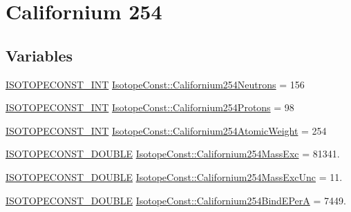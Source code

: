 \hypertarget{group___isotope_const-_californium-_cf254}{}\section{Californium 254}
\label{group___isotope_const-_californium-_cf254}
\subsection*{Variables}
\begin{DoxyCompactItemize}
\item 
\mbox{\hyperlink{group___isotope_const-_macros_ga5f18360b3e99483a35c32d789e62621c}{I\+S\+O\+T\+O\+P\+E\+C\+O\+N\+S\+T\+\_\+\+I\+NT}} \mbox{\hyperlink{group___isotope_const-_californium-_cf254_gaa3d11e9fb2a18ad59194f0b610e022b3}{Isotope\+Const\+::\+Californium254\+Neutrons}} = 156
\item 
\mbox{\hyperlink{group___isotope_const-_macros_ga5f18360b3e99483a35c32d789e62621c}{I\+S\+O\+T\+O\+P\+E\+C\+O\+N\+S\+T\+\_\+\+I\+NT}} \mbox{\hyperlink{group___isotope_const-_californium-_cf254_ga28959ec5181347d129c244cd2857908b}{Isotope\+Const\+::\+Californium254\+Protons}} = 98
\item 
\mbox{\hyperlink{group___isotope_const-_macros_ga5f18360b3e99483a35c32d789e62621c}{I\+S\+O\+T\+O\+P\+E\+C\+O\+N\+S\+T\+\_\+\+I\+NT}} \mbox{\hyperlink{group___isotope_const-_californium-_cf254_ga32bf7d3b9f1b613912fcafc1d3f68294}{Isotope\+Const\+::\+Californium254\+Atomic\+Weight}} = 254
\item 
\mbox{\hyperlink{group___isotope_const-_macros_ga8f45a7272ce02c0b4c65c44636ed719a}{I\+S\+O\+T\+O\+P\+E\+C\+O\+N\+S\+T\+\_\+\+D\+O\+U\+B\+LE}} \mbox{\hyperlink{group___isotope_const-_californium-_cf254_gac16ac95444d8e015202cd73c83f217c6}{Isotope\+Const\+::\+Californium254\+Mass\+Exc}} = 81341.
\item 
\mbox{\hyperlink{group___isotope_const-_macros_ga8f45a7272ce02c0b4c65c44636ed719a}{I\+S\+O\+T\+O\+P\+E\+C\+O\+N\+S\+T\+\_\+\+D\+O\+U\+B\+LE}} \mbox{\hyperlink{group___isotope_const-_californium-_cf254_ga8923a2bf68a91483801ed8de162ee392}{Isotope\+Const\+::\+Californium254\+Mass\+Exc\+Unc}} = 11.
\item 
\mbox{\hyperlink{group___isotope_const-_macros_ga8f45a7272ce02c0b4c65c44636ed719a}{I\+S\+O\+T\+O\+P\+E\+C\+O\+N\+S\+T\+\_\+\+D\+O\+U\+B\+LE}} \mbox{\hyperlink{group___isotope_const-_californium-_cf254_ga36cc921d04aab2a2c6ecd2c63a3da4c7}{Isotope\+Const\+::\+Californium254\+Bind\+E\+PerA}} = 7449.

\end{DoxyCompactItemize}
